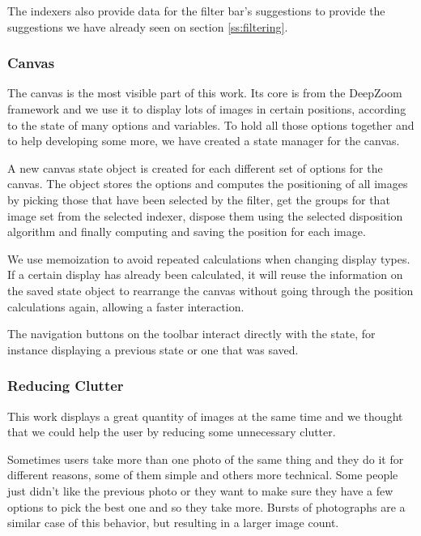 The indexers also provide data for the filter bar's suggestions to provide the suggestions we have already seen on section \ref{ss:filtering}.

\vspace{-5px}
\subsubsection{Canvas}

The canvas is the most visible part of this work. Its core is from the DeepZoom framework and we use it to display lots of images in certain positions, according to the state of many options and variables. To hold all those options together and to help developing some more, we have created a state manager for the canvas.

A new canvas state object is created for each different set of options for the canvas. The object stores the options and computes the positioning of all images by picking those that have been selected by the filter, get the groups for that image set from the selected indexer, dispose them using the selected disposition algorithm and finally computing and saving the position for each image.

We use memoization to avoid repeated calculations when changing display types. If a certain display has already been calculated, it will reuse the information on the saved state object to rearrange the canvas without going through the position calculations again, allowing a faster interaction.

The navigation buttons on the toolbar interact directly with the state, for instance displaying a previous state or one that was saved.


\vspace{-5px}
\subsubsection{Reducing Clutter}
\label{ss:stacks}

This work displays a great quantity of images at the same time and we thought that we could help the user by reducing some unnecessary clutter.

Sometimes users take more than one photo of the same thing and they do it for different reasons, some of them simple and others more technical. Some people just didn't like the previous photo or they want to make sure they have a few options to pick the best one and so they take more. Bursts of photographs are a similar case of this behavior, but resulting in a larger image count.


